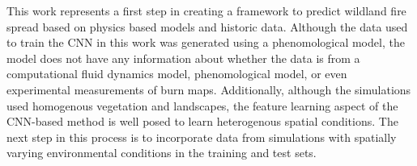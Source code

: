 \documentclass[smallcondensed]{svjour3}     %
\begin{document}
This work represents a first step in creating a framework to predict
wildland fire spread based on physics based models and historic data.
Although the data
used to train the CNN in this work was generated using a phenomological
model, the model does not have any information about whether the data
is from a computational fluid dynamics model, phenomological model, or
even experimental measurements of burn maps. Additionally, although
the simulations used homogenous vegetation and
landscapes, the feature learning aspect of the CNN-based method is
well posed to learn heterogenous spatial conditions. The next step
in this process is to incorporate data from simulations with spatially
varying environmental conditions in the training and test sets.









%
%





%
%

\end{document}
